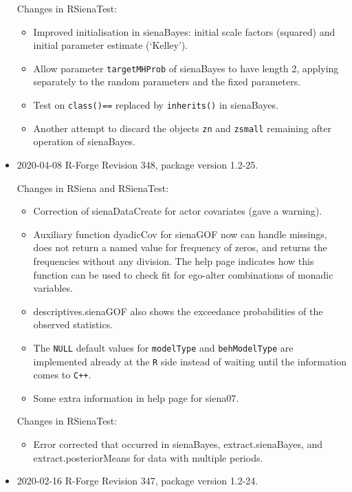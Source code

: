 \documentclass[a4paper,fleqn,11pt]{article}
\newcommand{\+}{\, + \,}
\newcommand{\sfn}[1]{\textsf{#1}}
\begin{document}
\begin{small}
\begin{itemize}
Changes in RSienaTest:
\begin{itemize}
   \item Improved initialisation in \sfn{sienaBayes}: initial scale factors (squared)
     and initial parameter estimate (`Kelley').
   \item Allow parameter \texttt{targetMHProb} of \sfn{sienaBayes} to have length 2,
        applying separately to the random parameters and the fixed parameters.
   \item Test on \texttt{class()==} replaced by \texttt{inherits()} in \sfn{sienaBayes}.
   \item Another attempt to discard the objects \texttt{zn} and \texttt{zsmall} remaining after operation
     of \sfn{sienaBayes}.
\end{itemize}




\item 2020-04-08 R-Forge Revision 348, package version 1.2-25.

Changes in RSiena and RSienaTest:
\begin{itemize}
 \item Correction of \sfn{sienaDataCreate} for actor covariates (gave a warning).
 \item Auxiliary function \sfn{dyadicCov} for \sfn{sienaGOF} now can handle missings,
     does not return a named value for frequency of zeros,
     and returns the frequencies without any division.
     The help page indicates how this function can be used to check fit
     for ego-alter combinations of monadic variables.
 \item \sfn{descriptives.sienaGOF} also shows the exceedance probabilities
     of the observed statistics.
 \item The \texttt{NULL} default values for \texttt{modelType}
     and \texttt{behModelType} are implemented already at the \texttt{R}
     side instead of waiting until the information comes to \texttt{C++}.
 \item Some extra information in help page for \sfn{siena07}.
\end{itemize}

Changes in RSienaTest:
\begin{itemize}
 \item Error corrected that occurred in \sfn{sienaBayes}, \sfn{extract.sienaBayes},
 and \sfn{extract.posteriorMeans} for data with multiple periods.
\end{itemize}


\item 2020-02-16 R-Forge Revision 347, package version 1.2-24.


\end{itemize}
\end{small}
\end{document}
